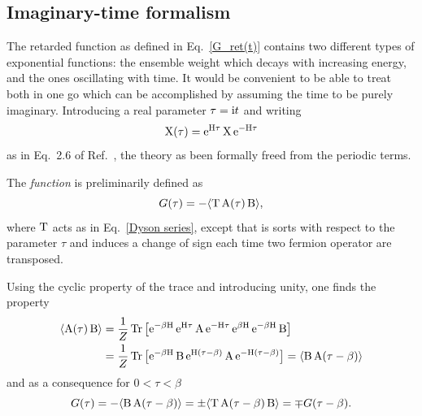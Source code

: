 \subsection{Imaginary-time formalism}

The retarded  function as defined in Eq.~\ref{G_ret(t)} contains two
different types of exponential functions: the ensemble weight which decays with
increasing energy, and the ones oscillating with time. It would be convenient to
be able to treat both in one go which can be accomplished by assuming the time
to be purely imaginary. Introducing a real parameter $\tau = \mathrm i t$ and writing
%
\begin{equation*}
    \mathrm X(\tau) = \mathrm e^{\mathrm H \tau} \, \mathrm X \, \mathrm e^{-\mathrm H \tau}
\end{equation*}
%
as in Eq.~2.6 of Ref.~, the theory as been formally freed
from the periodic terms.

The \emph{ function} is preliminarily defined as
%
\begin{equation*}
    G(\tau) = -\langle\mathrm T \, \mathrm A(\tau) \, \mathrm B\rangle,
\end{equation*}
%
where $\mathrm T$ acts as in Eq.~\ref{Dyson series}, except that is sorts with
respect to the parameter $\tau$ and induces a change of sign each time two
fermion operator are transposed.

Using the cyclic property of the trace and introducing unity, one finds the
property
%
\begin{align*}
    \langle\mathrm A(\tau) \, \mathrm B\rangle &= \frac 1 Z \operatorname{Tr} \big[ \mathrm e^{-\beta \mathrm H} \,
    \mathrm e^{\mathrm H \tau} \, \mathrm A \, \mathrm e^{-\mathrm H \tau} \,
    \mathrm e^{\beta \mathrm H} \, \mathrm e^{-\beta \mathrm H} \, \mathrm B \big]
    \\
    &= \frac 1 Z \operatorname{Tr} \big[ \mathrm e^{-\beta \mathrm H} \, \mathrm B \,
    \mathrm e^{\mathrm H (\tau - \beta)} \, \mathrm A \, \mathrm e^{-\mathrm H (\tau - \beta)} \big]
    = \langle\mathrm B \, \mathrm A(\tau - \beta)\rangle
\end{align*}
%
and as a consequence for $0 < \tau < \beta$
%
\begin{equation} \label{(anti-) periodicity}
    G(\tau)
    = -\langle\mathrm B \, \mathrm A(\tau - \beta)\rangle
    = \pm \langle\mathrm T \, \mathrm A(\tau - \beta) \, \mathrm B\rangle
    = \mp G(\tau - \beta).
\end{equation}

